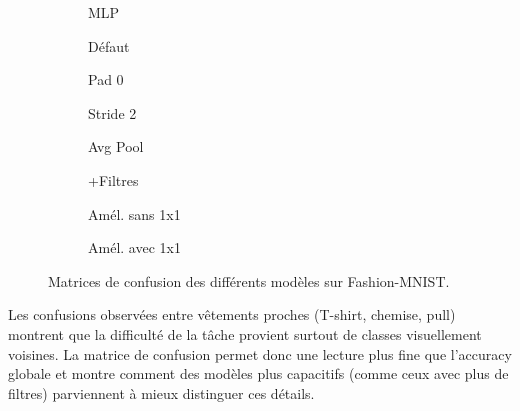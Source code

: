 \begin{figure}[H]
    \centering
    \begin{subfigure}[b]{0.24\textwidth}
        \caption{MLP}
    \end{subfigure}
    \hfill
    \begin{subfigure}[b]{0.24\textwidth}
        \caption{Défaut}
    \end{subfigure}
    \hfill
    \begin{subfigure}[b]{0.24\textwidth}
        \caption{Pad 0}
    \end{subfigure}
    \hfill
    \begin{subfigure}[b]{0.24\textwidth}
        \caption{Stride 2}
    \end{subfigure}
    
    \vspace{0.3cm}
    \begin{subfigure}[b]{0.24\textwidth}
        \caption{Avg Pool}
    \end{subfigure}
    \hfill
    \begin{subfigure}[b]{0.24\textwidth}
        \caption{+Filtres}
    \end{subfigure}
    \hfill
    \begin{subfigure}[b]{0.24\textwidth}
        \caption{Amél. sans 1x1}
    \end{subfigure}
    \hfill
    \begin{subfigure}[b]{0.24\textwidth}
        \caption{Amél. avec 1x1}
    \end{subfigure}
    
    \caption{Matrices de confusion des différents modèles sur Fashion-MNIST.}
\end{figure}
Les confusions observées entre vêtements proches (T-shirt, chemise, pull) montrent que la difficulté de la tâche provient surtout de classes visuellement voisines. La matrice de confusion permet donc une lecture plus fine que l’accuracy globale et montre comment des modèles plus capacitifs (comme ceux avec plus de filtres) parviennent à mieux distinguer ces détails.

